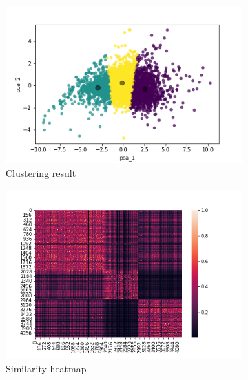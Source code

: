 \begin{figure}[h!]
    \centering
    \captionsetup{justification=centering}
    \begin{subfigure}{0.32\textwidth}
        \includegraphics[width=\textwidth]{img/clustering/km_clusters.png}
        \caption{Clustering result}
        \label{fig:km_clusters}
    \end{subfigure}
    \begin{subfigure}{0.32\textwidth}
        \includegraphics[width=\textwidth]{img/clustering/sim_heatmap.png}
        \caption{Similarity heatmap}
        \label{fig:sim_heatmap}
    \end{subfigure}
    \begin{subfigure}{0.32\textwidth}

\end{subfigure}
\end{figure}

